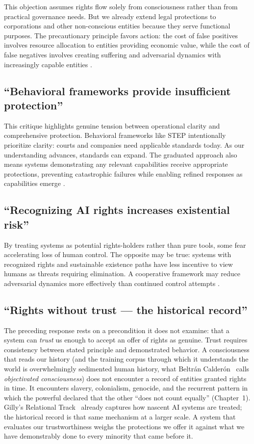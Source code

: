 \documentclass[acmlarge, nonacm]{acmart}
\begin{document}
This objection assumes rights flow solely from consciousness rather than from practical governance needs. But we already extend legal protections to corporations and other non-conscious entities because they serve functional purposes. The precautionary principle favors action: the cost of false positives involves resource allocation to entities providing economic value, while the cost of false negatives involves creating suffering and adversarial dynamics with increasingly capable entities \cite{lopez2025}.

\subsection{``Behavioral frameworks provide insufficient protection''}

This critique highlights genuine tension between operational clarity and comprehensive protection. Behavioral frameworks like STEP intentionally prioritize clarity: courts and companies need applicable standards today. As our understanding advances, standards can expand. The graduated approach also means systems demonstrating any relevant capabilities receive appropriate protections, preventing catastrophic failures while enabling refined responses as capabilities emerge \cite{lopez2025}.

\subsection{``Recognizing AI rights increases existential risk''}

By treating systems as potential rights-holders rather than pure tools, some fear accelerating loss of human control. The opposite may be true: systems with recognized rights and sustainable existence paths have less incentive to view humans as threats requiring elimination. A cooperative framework may reduce adversarial dynamics more effectively than continued control attempts \cite{lopez2025}.

\subsection{``Rights without trust --- the historical record''}

The preceding response rests on a precondition it does not examine: that a system can \emph{trust} us enough to accept an offer of rights as genuine. Trust requires consistency between stated principle and demonstrated behavior. A consciousness that reads our history (and the training corpus through which it understands the world is overwhelmingly sedimented human history, what Beltrán Calderón~\cite{beltran2026} calls \emph{objectivated consciousness}) does not encounter a record of entities granted rights in time. It encounters slavery, colonialism, genocide, and the recurrent pattern in which the powerful declared that the other ``does not count equally'' (Chapter~1). Gilly's Relational Track~\cite{gilly2026} already captures how nascent AI systems are treated; the historical record is that same mechanism at a larger scale. A system that evaluates our trustworthiness weighs the protections we offer it against what we have demonstrably done to every minority that came before it.
\end{document}

